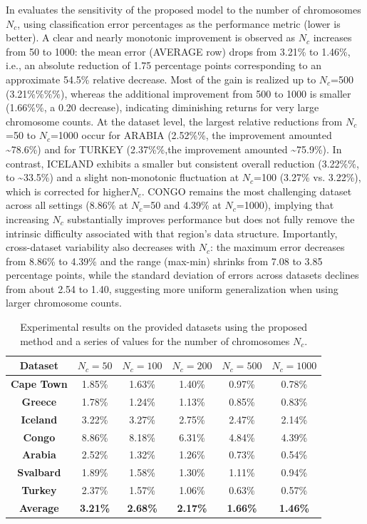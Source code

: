 \documentclass[12pt]{Definitions/academia}
\begin{document}
In  evaluates the sensitivity
of the proposed model to the number of chromosomes $N_{c}$, using
classification error percentages as the performance metric (lower
is better). A clear and nearly monotonic improvement is observed as
$N_{c}$ increases from 50 to 1000: the mean error (AVERAGE row) drops
from 3.21\% to 1.46\%, i.e., an absolute reduction of 1.75 percentage
points corresponding to an approximate 54.5\% relative decrease. Most
of the gain is realized up to $N_{c}$=500 (3.21\%\%\%\%),
whereas the additional improvement from 500 to 1000 is smaller (1.66\%\%,
a 0.20 decrease), indicating diminishing returns for very large chromosome
counts. At the dataset level, the largest relative reductions from
$N_{c}$=50 to $N_{c}$=1000 occur for ARABIA (2.52\%\%, the improvement amounted
\textasciitilde 78.6\%) and for TURKEY (2.37\%\%,the improvement amounted
\textasciitilde 75.9\%). In contrast, ICELAND exhibits a smaller
but consistent overall reduction (3.22\%\%, to \textasciitilde 33.5\%)
and a slight non-monotonic fluctuation at $N_{c}$=100 (3.27\% vs.
3.22\%), which is corrected for higher$N_{c}$. CONGO remains the
most challenging dataset across all settings (8.86\% at $N_{c}$=50
and 4.39\% at $N_{c}$=1000), implying that increasing $N_{c}$ substantially
improves performance but does not fully remove the intrinsic difficulty
associated with that region\textquoteright s data structure. Importantly,
cross-dataset variability also decreases with $N_{c}$: the maximum
error decreases from 8.86\% to 4.39\% and the range (max-min) shrinks
from 7.08 to 3.85 percentage points, while the standard deviation
of errors across datasets declines from about 2.54 to 1.40, suggesting
more uniform generalization when using larger chromosome counts.

\begin{table}[H]
	\centering
\begin{tabular}{|c|c|c|c|c|c|}
\hline
\textbf{Dataset} & \textbf{$N_{c}=50$} & \textbf{$N_{c}=100$} & \textbf{$N_{c}=200$} & \textbf{$N_{c}=500$} & \textbf{$N_{c}=1000$}\tabularnewline
\hline
\hline
\textbf{Cape Town} & 1.85\% & 1.63\% & 1.40\% & 0.97\% & 0.78\%\tabularnewline
\hline
\textbf{Greece} & 1.78\% & 1.24\% & 1.13\% & 0.85\% & 0.83\%\tabularnewline
\hline
\textbf{Iceland} & 3.22\% & 3.27\% & 2.75\% & 2.47\% & 2.14\%\tabularnewline
\hline
\textbf{Congo} & 8.86\% & 8.18\% & 6.31\% & 4.84\% & 4.39\%\tabularnewline
\hline
\textbf{Arabia} & 2.52\% & 1.32\% & 1.26\% & 0.73\% & 0.54\%\tabularnewline
\hline
\textbf{Svalbard} & 1.89\% & 1.58\% & 1.30\% & 1.11\% & 0.94\%\tabularnewline
\hline
\textbf{Turkey} & 2.37\% & 1.57\% & 1.06\% & 0.63\% & 0.57\%\tabularnewline
\hline
\textbf{Average} & \textbf{3.21\%} & \textbf{2.68\%} & \textbf{2.17\%} & \textbf{1.66\%} & \textbf{1.46\%}\tabularnewline
\hline
\end{tabular}
\vspace{1em}
\caption{Experimental results on the provided datasets using the proposed method
and a series of values for the number of chromosomes $N_{c}$.\label{tab:Table-7-Experimental-results-on-1}}
\end{table}
\end{document}
